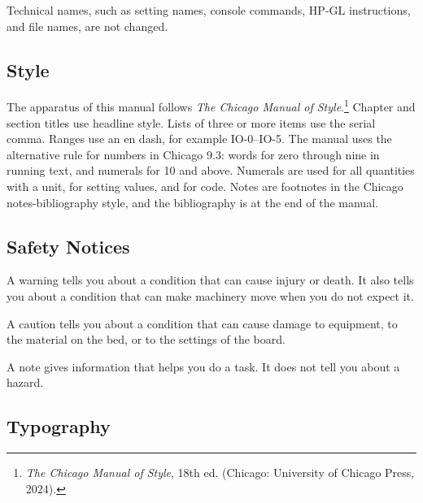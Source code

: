 Technical names, such as setting names, console commands, HP-GL
instructions, and file names, are not changed.

\subsection*{Style}

The apparatus of this manual follows \textit{The Chicago Manual of
Style}.\footnote{\textit{The Chicago Manual of Style}, 18th ed. (Chicago:
University of Chicago Press, 2024).} Chapter and section titles use headline
style. Lists of three or more items use the serial comma. Ranges use an en
dash, for example IO-0--IO-5. The manual uses the alternative rule for numbers
in Chicago 9.3: words for zero through nine in running text, and numerals for
10 and above. Numerals are used for all quantities with a unit, for setting
values, and for code. Notes are footnotes in the Chicago notes-bibliography
style, and the bibliography is at the end of the manual.

\subsection*{Safety Notices}

\begin{warning}
A warning tells you about a condition that can cause injury or death. It
also tells you about a condition that can make machinery move when you do
not expect it.
\end{warning}

\begin{caution}
A caution tells you about a condition that can cause damage to equipment,
to the material on the bed, or to the settings of the board.
\end{caution}

\begin{note}
\notelabel A note gives information that helps you do a task. It does not
tell you about a hazard.
\end{note}

\subsection*{Typography}


